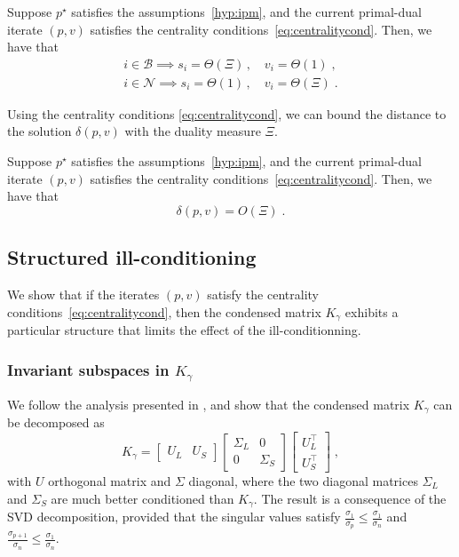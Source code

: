 \begin{proposition}
  \label{prop:cond:boundslack}
  Suppose $p^\star$ satisfies the assumptions~\ref{hyp:ipm},
  and the current primal-dual iterate $(p, v)$ satisfies the centrality
  conditions~\eqref{eq:centralitycond}. Then, we have that
  \begin{subequations}
    \begin{align}
      i \in \mathcal{B} \implies s_i = \Theta(\Xi) \, , \quad v_i = \Theta(1) \;, \\
      i \in \mathcal{N} \implies s_i = \Theta(1) \, , \quad v_i = \Theta(\Xi) \; .
    \end{align}
  \end{subequations}
\end{proposition}
Using the centrality conditions \eqref{eq:centralitycond}, we can bound
the distance to the solution $\delta(p, v)$ with the duality measure $\Xi$.
\begin{theorem}
  Suppose $p^\star$ satisfies the assumptions~\ref{hyp:ipm},
  and the current primal-dual iterate $(p, v)$ satisfies the centrality
  conditions~\eqref{eq:centralitycond}. Then, we have that
  \begin{equation}
    \delta(p, v) = O(\Xi) \; .
  \end{equation}
\end{theorem}

\subsection{Structured ill-conditioning}
We show that if the iterates $(p, v)$ satisfy
the centrality conditions~\eqref{eq:centralitycond}, then the
condensed matrix $K_\gamma$ exhibits a particular structure that limits
the effect of the ill-conditionning.

\subsubsection{Invariant subspaces in $K_\gamma$}
We follow the analysis presented in \cite{wright1998ill},
and show that the condensed matrix $K_\gamma$ can be decomposed as
\begin{equation}
  \label{eq:cond:svd}
  K_\gamma = \begin{bmatrix} U_L & U_S \end{bmatrix}
  \begin{bmatrix}
    \Sigma_L & 0 \\ 0 & \Sigma_S
  \end{bmatrix}
  \begin{bmatrix}
    U_L^\top \\ U_S^\top
  \end{bmatrix}
  \; ,
\end{equation}
with $U$ orthogonal matrix and $\Sigma$ diagonal, where
the two diagonal matrices $\Sigma_L$ and $\Sigma_S$ are much better conditioned than $K_\gamma$.
The result is a consequence of the SVD decomposition,
provided that the singular values satisfy $\frac{\sigma_1}{\sigma_{p}} \leq \frac{\sigma_1}{\sigma_n}$
and $\frac{\sigma_{p+1}}{\sigma_{n}} \leq \frac{\sigma_1}{\sigma_n}$.

